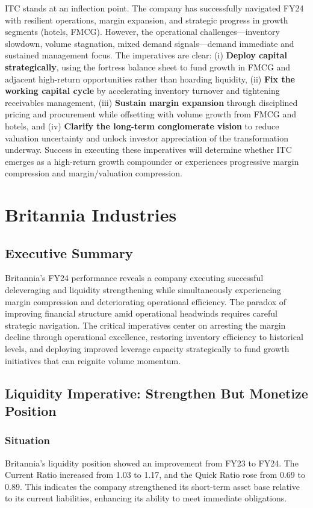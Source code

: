 \documentclass[12pt, a4paper]{report}
\begin{document}
ITC stands at an inflection point. The company has successfully navigated FY24 with resilient operations, margin expansion, and strategic progress in growth segments (hotels, FMCG). However, the operational challenges—inventory slowdown, volume stagnation, mixed demand signals—demand immediate and sustained management focus. The imperatives are clear: (i) \textbf{Deploy capital strategically}, using the fortress balance sheet to fund growth in FMCG and adjacent high-return opportunities rather than hoarding liquidity, (ii) \textbf{Fix the working capital cycle} by accelerating inventory turnover and tightening receivables management, (iii) \textbf{Sustain margin expansion} through disciplined pricing and procurement while offsetting with volume growth from FMCG and hotels, and (iv) \textbf{Clarify the long-term conglomerate vision} to reduce valuation uncertainty and unlock investor appreciation of the transformation underway. Success in executing these imperatives will determine whether ITC emerges as a high-return growth compounder or experiences progressive margin compression and margin/valuation compression.

\newpage

\section{Britannia Industries}

\subsection{Executive Summary}

Britannia's FY24 performance reveals a company executing successful deleveraging and liquidity strengthening while simultaneously experiencing margin compression and deteriorating operational efficiency. The paradox of improving financial structure amid operational headwinds requires careful strategic navigation. The critical imperatives center on arresting the margin decline through operational excellence, restoring inventory efficiency to historical levels, and deploying improved leverage capacity strategically to fund growth initiatives that can reignite volume momentum.

\subsection{Liquidity Imperative: Strengthen But Monetize Position}

\subsubsection{Situation}
Britannia's liquidity position showed an improvement from FY23 to FY24. The Current Ratio increased from 1.03 to 1.17, and the Quick Ratio rose from 0.69 to 0.89. This indicates the company strengthened its short-term asset base relative to its current liabilities, enhancing its ability to meet immediate obligations.
\end{document}
